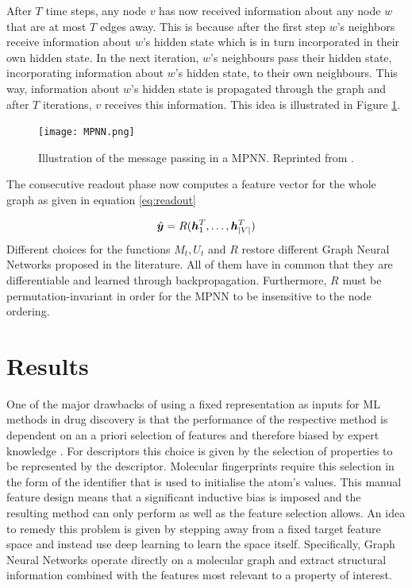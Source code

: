 After $T$ time steps, any node $v$ has now received information about any node $w$ that are at most $T$ edges away. This is because after the first step $w$'s neighbors receive information about $w$'s hidden state which is in turn incorporated in their own hidden state. In the next iteration, $w$'s neighbours pass their hidden state, incorporating information about $w$'s hidden state, to their own neighbours. This way, information about $w$'s hidden state is propagated through the graph and after $T$ iterations, $v$ receives this information. This idea is illustrated in Figure \ref{fig:mpnn}.
\begin{figure}[h]
	\centering 
	\texttt{[image: MPNN.png]}
	\caption{Illustration of the message passing in a MPNN. Reprinted from \cite{mpnn_graphics}. }
	\label{fig:mpnn}
\end{figure}

The consecutive readout phase now computes a feature vector for the whole graph as given in equation \ref{eq:readout}

\begin{equation}
\hat{\boldsymbol y} = R(\boldsymbol h_1^T, \ldots, \boldsymbol h_{|V|}^T) \label{eq:readout}
\end{equation}
Different choices for the functions $M_t, U_t$ and $R$ restore different Graph Neural Networks proposed in the literature. All of them have in common that they are differentiable and learned through backpropagation. Furthermore, $R$ must be permutation-invariant in order for the MPNN to be insensitive to the node ordering.




\section{Results}
\label{sec:results}
One of the major drawbacks of using a fixed representation as inputs for ML methods in drug discovery is that the performance of the respective method is dependent on an a priori selection of features and therefore biased by expert knowledge \cite{merkwirth}. For descriptors this choice is given by the selection of properties to be represented by the descriptor. Molecular fingerprints require this selection in the form of the identifier that is used to initialise the atom's values. This manual feature design means that a significant inductive bias is imposed and the resulting method can only perform as well as the feature selection allows. An idea to remedy this problem is given by stepping away from a fixed target feature space and instead use deep learning to learn the space itself. Specifically, Graph Neural Networks operate directly on a molecular graph and extract structural information combined with the features most relevant to a property of interest.

